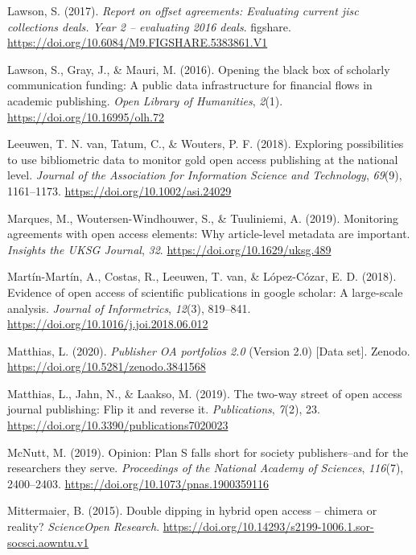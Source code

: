 \documentclass[a4paper,man,floatsintext,longtable,noextraspace,12pt]{apa6}
\newenvironment{CSLReferences}%
  {}%
  {\par}
\begin{document}
\begin{CSLReferences}{1}{0}
\leavevmode\hypertarget{ref-Lawson_2018}{}%
Lawson, S. (2017). \emph{Report on offset agreements: Evaluating current
jisc collections deals. Year 2 -- evaluating 2016 deals}. figshare.
\url{https://doi.org/10.6084/M9.FIGSHARE.5383861.V1}

\leavevmode\hypertarget{ref-Lawson_2016}{}%
Lawson, S., Gray, J., \& Mauri, M. (2016). Opening the black box of
scholarly communication funding: A public data infrastructure for
financial flows in academic publishing. \emph{Open Library of
Humanities}, \emph{2}(1). \url{https://doi.org/10.16995/olh.72}

\leavevmode\hypertarget{ref-van_Leeuwen_2018}{}%
Leeuwen, T. N. van, Tatum, C., \& Wouters, P. F. (2018). Exploring
possibilities to use bibliometric data to monitor gold open access
publishing at the national level. \emph{Journal of the Association for
Information Science and Technology}, \emph{69}(9), 1161--1173.
\url{https://doi.org/10.1002/asi.24029}

\leavevmode\hypertarget{ref-Marques_2019}{}%
Marques, M., Woutersen-Windhouwer, S., \& Tuuliniemi, A. (2019).
Monitoring agreements with open access elements: Why article-level
metadata are important. \emph{Insights the {UKSG} Journal}, \emph{32}.
\url{https://doi.org/10.1629/uksg.489}

\leavevmode\hypertarget{ref-Mart_n_Mart_n_2018}{}%
Martín-Martín, A., Costas, R., Leeuwen, T. van, \& López-Cózar, E. D.
(2018). Evidence of open access of scientific publications in google
scholar: A large-scale analysis. \emph{Journal of Informetrics},
\emph{12}(3), 819--841. \url{https://doi.org/10.1016/j.joi.2018.06.012}

\leavevmode\hypertarget{ref-Matthias_2020}{}%
Matthias, L. (2020). \emph{Publisher OA portfolios 2.0} (Version 2.0)
{[}Data set{]}. Zenodo. \url{https://doi.org/10.5281/zenodo.3841568}

\leavevmode\hypertarget{ref-Matthias_2019}{}%
Matthias, L., Jahn, N., \& Laakso, M. (2019). The two-way street of open
access journal publishing: Flip it and reverse it. \emph{Publications},
\emph{7}(2), 23. \url{https://doi.org/10.3390/publications7020023}

\leavevmode\hypertarget{ref-McNutt_2019}{}%
McNutt, M. (2019). Opinion: {Plan S} falls short for society
publishers--and for the researchers they serve. \emph{Proceedings of the
National Academy of Sciences}, \emph{116}(7), 2400--2403.
\url{https://doi.org/10.1073/pnas.1900359116}

\leavevmode\hypertarget{ref-Mittermaier_2015}{}%
Mittermaier, B. (2015). Double dipping in hybrid open access -- chimera
or reality? \emph{{ScienceOpen} Research}.
\url{https://doi.org/10.14293/s2199-1006.1.sor-socsci.aowntu.v1}


\end{CSLReferences}
\end{document}
